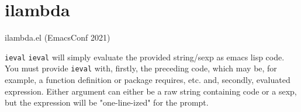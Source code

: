 \documentclass[presentation]{beamer}
\begin{document}
\section{ilambda}
\label{sec:org9c72254}
\begin{frame}[label={sec:orgecd2e7b},fragile]{ilambda.el (EmacsConf 2021)}
 \begin{block}{\texttt{ieval}}
\texttt{ieval} will simply evaluate the provided
string/sexp as emacs lisp code. You
must provide \texttt{ieval} with, firstly, the preceding
code, which may be, for example, a function
definition or package requires, etc. and,
secondly, evaluated expression. Either
argument can either be a raw string containing
code or a sexp, but the expression will be
"one-line-ized" for the prompt.
\end{block}
\end{frame}
\end{document}
